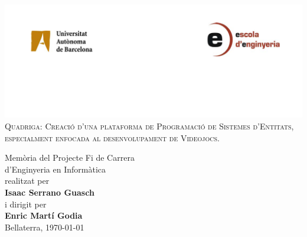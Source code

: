 \begin{titlepage}

\begin{center}


\includegraphics[width=1.00\textwidth]{./img/logoUAB.png}\\[1cm]    

\textsc{\LARGE Quadriga: Creació d'una plataforma de Programació de Sistemes d'Entitats, especialment enfocada al desenvolupament de Videojocs.}\\[1.5cm]



\end{center}

\begin{flushright}

\vfill

\begin{minipage}{0.4\textwidth}
\end{minipage}
\begin{minipage}{0.6\textwidth}
Memòria del Projecte Fi de Carrera \\
d'Enginyeria en Informàtica \\
realitzat per \\
{\bf Isaac Serrano Guasch} \\
i dirigit per \\
{\bf Enric Martí Godia} \\
Bellaterra, \today
\end{minipage}

\end{flushright}

\end{titlepage}